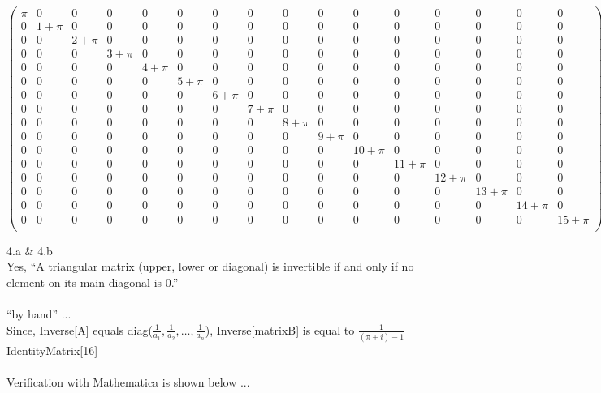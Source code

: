 \documentclass[11pt,a4paper]{article}
\begin{document}
\begin{doublespace}
\noindent\(\left(
\begin{array}{cccccccccccccccc}
 \pi  & 0 & 0 & 0 & 0 & 0 & 0 & 0 & 0 & 0 & 0 & 0 & 0 & 0 & 0 & 0 \\
 0 & 1+\pi  & 0 & 0 & 0 & 0 & 0 & 0 & 0 & 0 & 0 & 0 & 0 & 0 & 0 & 0 \\
 0 & 0 & 2+\pi  & 0 & 0 & 0 & 0 & 0 & 0 & 0 & 0 & 0 & 0 & 0 & 0 & 0 \\
 0 & 0 & 0 & 3+\pi  & 0 & 0 & 0 & 0 & 0 & 0 & 0 & 0 & 0 & 0 & 0 & 0 \\
 0 & 0 & 0 & 0 & 4+\pi  & 0 & 0 & 0 & 0 & 0 & 0 & 0 & 0 & 0 & 0 & 0 \\
 0 & 0 & 0 & 0 & 0 & 5+\pi  & 0 & 0 & 0 & 0 & 0 & 0 & 0 & 0 & 0 & 0 \\
 0 & 0 & 0 & 0 & 0 & 0 & 6+\pi  & 0 & 0 & 0 & 0 & 0 & 0 & 0 & 0 & 0 \\
 0 & 0 & 0 & 0 & 0 & 0 & 0 & 7+\pi  & 0 & 0 & 0 & 0 & 0 & 0 & 0 & 0 \\
 0 & 0 & 0 & 0 & 0 & 0 & 0 & 0 & 8+\pi  & 0 & 0 & 0 & 0 & 0 & 0 & 0 \\
 0 & 0 & 0 & 0 & 0 & 0 & 0 & 0 & 0 & 9+\pi  & 0 & 0 & 0 & 0 & 0 & 0 \\
 0 & 0 & 0 & 0 & 0 & 0 & 0 & 0 & 0 & 0 & 10+\pi  & 0 & 0 & 0 & 0 & 0 \\
 0 & 0 & 0 & 0 & 0 & 0 & 0 & 0 & 0 & 0 & 0 & 11+\pi  & 0 & 0 & 0 & 0 \\
 0 & 0 & 0 & 0 & 0 & 0 & 0 & 0 & 0 & 0 & 0 & 0 & 12+\pi  & 0 & 0 & 0 \\
 0 & 0 & 0 & 0 & 0 & 0 & 0 & 0 & 0 & 0 & 0 & 0 & 0 & 13+\pi  & 0 & 0 \\
 0 & 0 & 0 & 0 & 0 & 0 & 0 & 0 & 0 & 0 & 0 & 0 & 0 & 0 & 14+\pi  & 0 \\
 0 & 0 & 0 & 0 & 0 & 0 & 0 & 0 & 0 & 0 & 0 & 0 & 0 & 0 & 0 & 15+\pi  \\
\end{array}
\right)\)
\end{doublespace}

\clearpage

4.a $\&$ 4.b\\
Yes, {``}A triangular matrix (upper, lower or diagonal) is invertible if and only if no element on its main diagonal is 0.{''}\\
\\
{``}by hand{''} ...\\
Since, Inverse[A] equals diag($\frac{1}{a_1},\frac{1}{a_2},\ldots ,\frac{1}{a_n}$), Inverse[matrixB] is equal to $\frac{1}{(\pi +i)-1}$IdentityMatrix[16]\\
\\
Verification with Mathematica is shown below ...
\end{document}
